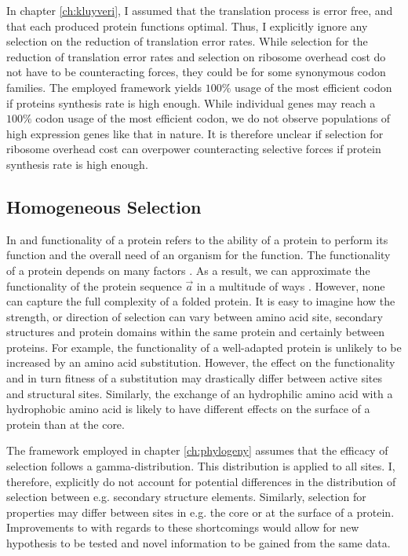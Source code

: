 In chapter \ref{ch:kluyveri}, I assumed that the translation process is error free, and that each produced protein functions optimal.
Thus, I explicitly ignore any selection on the reduction of translation error rates.
While selection for the reduction of translation error rates and selection on ribosome overhead cost do not have to be counteracting forces, they could be for some synonymous codon families.
The employed \ROC framework \citep{gilchrist2015} yields $100 \%$ usage of the most efficient codon if proteins synthesis rate is high enough.
While individual genes may reach a $100 \%$ codon usage of the most efficient codon, we do not observe populations of high expression genes like that in nature.
It is therefore unclear if selection for ribosome overhead cost can overpower counteracting selective forces if protein synthesis rate is high enough.

\subsection{Homogeneous Selection}

In \ROC and \selac functionality of a protein refers to the ability of a protein to perform its function and the overall need of an organism for the function.
The functionality of a protein depends on many factors \citep{DrummondAndWilke2009}.
As a result, we can approximate the functionality of the protein sequence $\vec{a}$ in a multitude of ways \citep{Gibbs1873, grantham1974, Cohen2009}.
However, none can capture the full complexity of a folded protein.
It is easy to imagine how the strength, or direction of selection can vary between amino acid site, secondary structures and protein domains within the same protein and certainly between proteins.
For example, the functionality of a well-adapted protein is unlikely to be increased by an amino acid substitution.
However, the effect on the functionality and in turn fitness of a substitution may drastically differ between active sites and structural sites.
Similarly, the exchange of an hydrophilic amino acid with a hydrophobic amino acid is likely to have different effects on the surface of a protein than at the core. 

The \selac framework \citep{beaulieu2019} employed in chapter \ref{ch:phylogeny} assumes that the efficacy of selection follows a gamma-distribution.
This distribution is applied to all sites. 
I, therefore, explicitly do not account for potential differences in the distribution of selection between e.g. secondary structure elements.
Similarly, selection for \PC properties may differ between sites in e.g. the core or at the surface of a protein.
Improvements to \selac with regards to these shortcomings would allow for new hypothesis to be tested and novel information to be gained from the same data.
